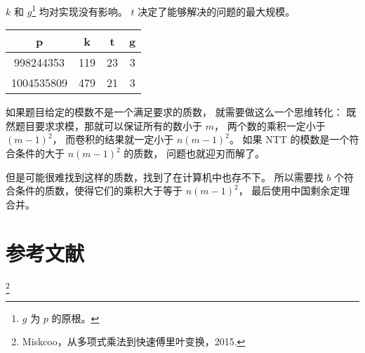 \documentclass[12pt, UTF8]{article}
\begin{document}
    $k$ 和 $g$\footnote{$g$ 为 $p$ 的原根。} 均对实现没有影响。
    $t$ 决定了能够解决的问题的最大规模。
    
    \bigskip
    \begin{center}
        \setlength{\tabcolsep}{10mm}
        \begin{tabular}{|c|c|c|c|}
        \hline
        p & k & t & g\\
        \hline
        998244353 & 119 & 23 & 3\\
        \hline
        1004535809 & 479 & 21 & 3\\
        \hline
        \end{tabular}
    \end{center}

    如果题目给定的模数不是一个满足要求的质数，
    就需要做这么一个思维转化：
    既然题目要求求模，那就可以保证所有的数小于 $m$，
    两个数的乘积一定小于 $(m - 1)^2$，
    而卷积的结果就一定小于 $n(m - 1)^2$。
    如果 NTT 的模数是一个符合条件的大于 $n(m - 1)^2$ 的质数，
    问题也就迎刃而解了。

    但是可能很难找到这样的质数，找到了在计算机中也存不下。
    所以需要找 $b$ 个符合条件的质数，使得它们的乘积大于等于 $n(m - 1)^2$，
    最后使用中国剩余定理合并。

    \section{参考文献}
    \thanks {Miskcoo，从多项式乘法到快速傅里叶变换，2015.}
\end{document}
